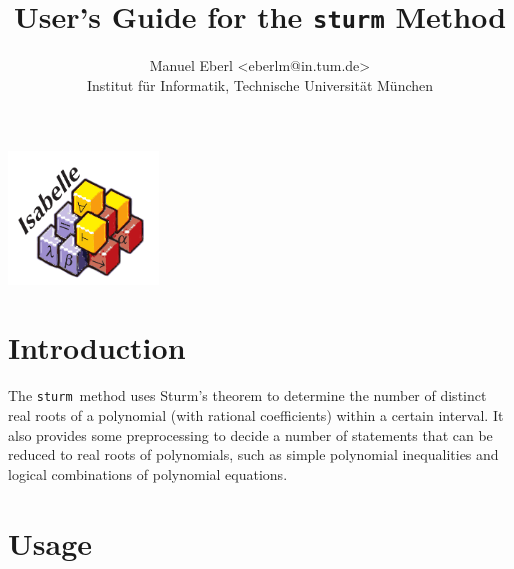 \documentclass[11pt,a4paper,oneside]{article}
\title{\LARGE User's Guide for the \texttt{sturm} Method\\[4mm]}
\author{\Large Manuel Eberl <eberlm@in.tum.de>\\[1mm]\large Institut für Informatik, Technische Universität München\\[4mm]}
\newcommand{\sturm}{\texttt{sturm}}
\begin{document}
\begin{center}
\vspace*{20mm}
\includegraphics[width=4cm]{isabelle.pdf}
\end{center}
\vspace*{-5mm}
{\let\newpage\relax\maketitle}
\vspace*{10mm}
\tableofcontents
\newpage

\section{Introduction}

The \sturm\ method uses Sturm's theorem to determine the number of distinct real roots of a polynomial (with rational coefficients) within a certain interval. It also provides some preprocessing to decide a number of statements that can be reduced to real roots of polynomials, such as simple polynomial inequalities and logical combinations of polynomial equations.
\vspace*{10mm}

\section{Usage}
\end{document}
